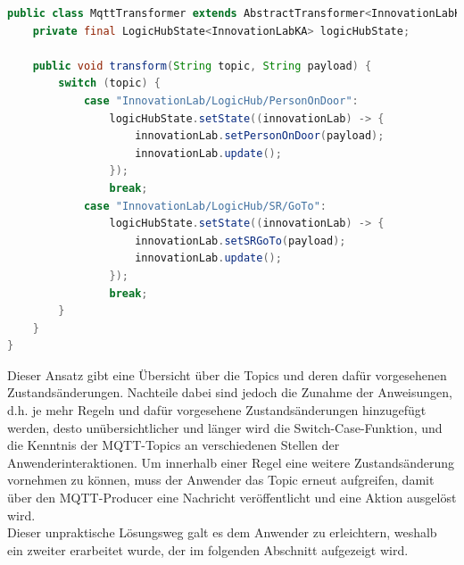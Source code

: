 \begin{lstlisting}[language=Java, frame=lines, xleftmargin=\parindent, style=algoBericht, label={code:switch-case}, captionpos=b, caption={Transformeation über eine Switch-Case-Anweisung}]
public class MqttTransformer extends AbstractTransformer<InnovationLabKA> {
    private final LogicHubState<InnovationLabKA> logicHubState;

    public void transform(String topic, String payload) {
        switch (topic) {
            case "InnovationLab/LogicHub/PersonOnDoor":
                logicHubState.setState((innovationLab) -> {
                    innovationLab.setPersonOnDoor(payload);
                    innovationLab.update();
                });
                break;
            case "InnovationLab/LogicHub/SR/GoTo":
                logicHubState.setState((innovationLab) -> {
                    innovationLab.setSRGoTo(payload);
                    innovationLab.update();
                });
                break;
        }    
    }
}
\end{lstlisting}
    Dieser Ansatz gibt eine Übersicht über die Topics und deren dafür vorgesehenen Zustandsänderungen. Nachteile dabei sind jedoch die Zunahme der Anweisungen, d.h. 
    je mehr Regeln und dafür vorgesehene Zustandsänderungen hinzugefügt werden, desto unübersichtlicher und länger wird die Switch-Case-Funktion, und die 
    Kenntnis der \acs{MQTT}-Topics an verschiedenen Stellen der Anwenderinteraktionen. Um innerhalb einer Regel eine weitere Zustandsänderung vornehmen zu können, muss der 
    Anwender das Topic erneut aufgreifen, damit über den \acs{MQTT}-Producer eine Nachricht veröffentlicht und eine Aktion ausgelöst wird. 
    \\
    Dieser unpraktische Lösungsweg galt es dem Anwender zu erleichtern, weshalb ein zweiter erarbeitet wurde, der im folgenden Abschnitt 
    aufgezeigt wird.

